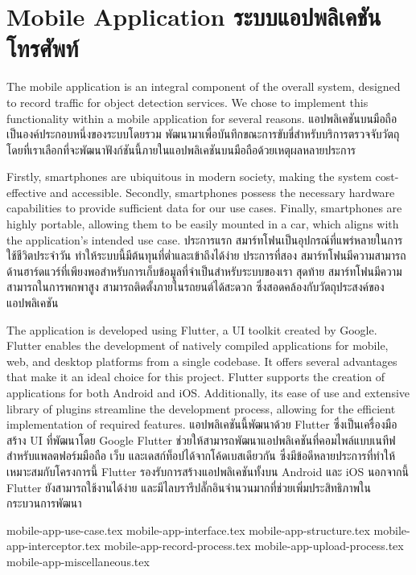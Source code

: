 \section{\ifenglish Mobile Application \else ระบบแอปพลิเคชันโทรศัพท์ \fi}
\ifenglish
The mobile application is an integral component of the overall system, designed to record traffic for object detection services. We chose to implement this functionality within a mobile application for several reasons.
\else
แอปพลิเคชันบนมือถือเป็นองค์ประกอบหนึ่งของระบบโดยรวม พัฒนามาเพื่อบันทึกขณะการขับขี่สำหรับบริการตรวจจับวัตถุ โดยที่เราเลือกที่จะพัฒนาฟังก์ชันนี้ภายในแอปพลิเคชันบนมือถือด้วยเหตุผลหลายประการ
\fi

\ifenglish
Firstly, smartphones are ubiquitous in modern society, making the system cost-effective and accessible. Secondly, smartphones possess the necessary hardware capabilities to provide sufficient data for our use cases. Finally, smartphones are highly portable, allowing them to be easily mounted in a car, which aligns with the application's intended use case.
\else
ประการแรก สมาร์ทโฟนเป็นอุปกรณ์ที่แพร่หลายในการใช้ชีวิตประจำวัน ทำให้ระบบนี้มีต้นทุนที่ต่ำและเข้าถึงได้ง่าย ประการที่สอง สมาร์ทโฟนมีความสามารถด้านฮาร์ดแวร์ที่เพียงพอสำหรับการเก็บข้อมูลที่จำเป็นสำหรับระบบของเรา สุดท้าย สมาร์ทโฟนมีความสามารถในการพกพาสูง สามารถติดตั้งภายในรถยนต์ได้สะดวก ซึ่งสอดคล้องกับวัตถุประสงค์ของแอปพลิเคชัน
\fi

\ifenglish
The application is developed using Flutter, a UI toolkit created by Google. Flutter enables the development of natively compiled applications for mobile, web, and desktop platforms from a single codebase. It offers several advantages that make it an ideal choice for this project. Flutter supports the creation of applications for both Android and iOS. Additionally, its ease of use and extensive library of plugins streamline the development process, allowing for the efficient implementation of required features.
\else
แอปพลิเคชันนี้พัฒนาด้วย Flutter ซึ่งเป็นเครื่องมือสร้าง UI ที่พัฒนาโดย Google Flutter ช่วยให้สามารถพัฒนาแอปพลิเคชันที่คอมไพล์แบบเนทีฟสำหรับแพลตฟอร์มมือถือ เว็บ และเดสก์ท็อปได้จากโค้ดเบสเดียวกัน ซึ่งมีข้อดีหลายประการที่ทำให้เหมาะสมกับโครงการนี้ Flutter รองรับการสร้างแอปพลิเคชันทั้งบน Android และ iOS นอกจากนี้ Flutter ยังสามารถใช้งานได้ง่าย และมีไลบรารีปลั๊กอินจำนวนมากที่ช่วยเพิ่มประสิทธิภาพในกระบวนการพัฒนา
\fi

\newcommand{\mobileDir}{chapters/approach/mobile-app}
{mobile-app-use-case.tex}
{mobile-app-interface.tex}
{mobile-app-structure.tex}
{mobile-app-interceptor.tex}
{mobile-app-record-process.tex}
{mobile-app-upload-process.tex}
{mobile-app-miscellaneous.tex}
